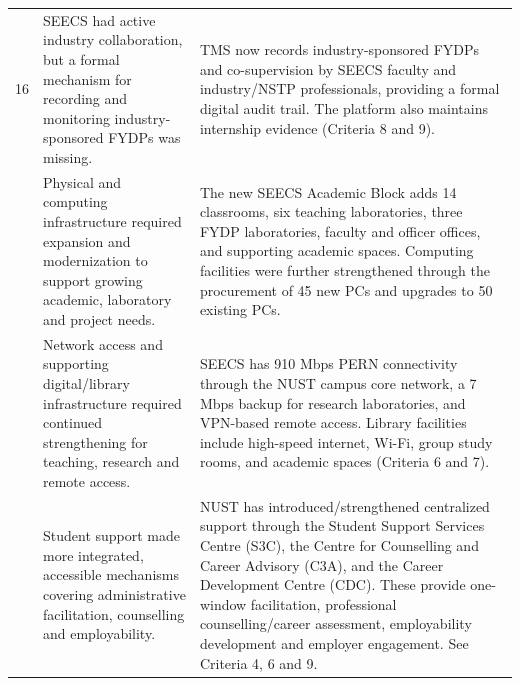 \begin{longtable}{@{}>{\centering\arraybackslash}p{}>{\raggedright\arraybackslash}p{}>{\raggedright\arraybackslash}p{}@{}}
\addlinespace[2pt]
16 & SEECS had active industry collaboration, but a formal mechanism for recording and monitoring industry-sponsored FYDPs was missing. & TMS now records industry-sponsored FYDPs and co-supervision by SEECS faculty and industry/NSTP professionals, providing a formal digital audit trail. The platform also maintains internship evidence (Criteria 8 and 9).\\
\addlinespace[2pt]
17 & Physical and computing infrastructure required expansion and modernization to support growing academic, laboratory and project needs. & The new SEECS Academic Block adds 14 classrooms, six teaching laboratories, three FYDP laboratories, faculty and officer offices, and supporting academic spaces. Computing facilities were further strengthened through the procurement of 45 new PCs and upgrades to 50 existing PCs.\\
\addlinespace[2pt]
18 & Network access and supporting digital/library infrastructure required continued strengthening for teaching, research and remote access. & SEECS has 910 Mbps PERN connectivity through the NUST campus core network, a 7 Mbps backup for research laboratories, and VPN-based remote access. Library facilities include high-speed internet, Wi-Fi, group study rooms, and academic spaces (Criteria 6 and 7).\\
\addlinespace[2pt]
19 & Student support made more integrated, accessible mechanisms covering administrative facilitation, counselling and employability. & NUST has introduced/strengthened centralized support through the Student Support Services Centre (S3C), the Centre for Counselling and Career Advisory (C3A), and the Career Development Centre (CDC). These provide one-window facilitation, professional counselling/career assessment, employability development and employer engagement. See Criteria 4, 6 and 9.\\
\end{longtable}
\endgroup

